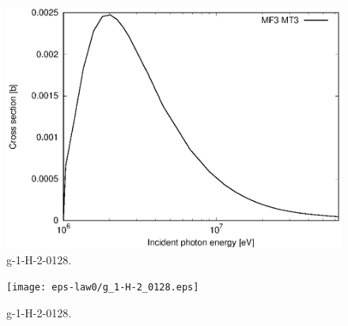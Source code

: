 \begin{figure}
 \includegraphics[width=\linewidth]{eps/g_1-H-2_0128.eps}
  \caption{g-1-H-2-0128.}
\end{figure}
\begin{figure}
 \texttt{[image: eps-law0/g\_1-H-2\_0128.eps]}
 \caption{g-1-H-2-0128.}
\end{figure}
\newpage \clearpage

